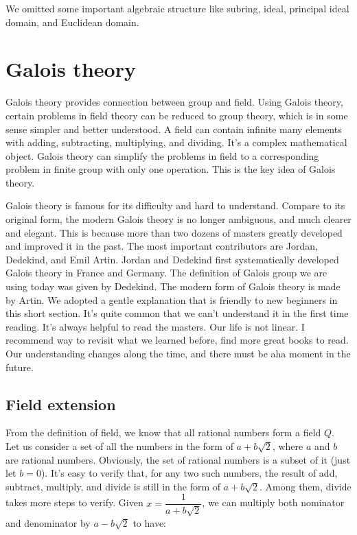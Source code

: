 \documentclass{article}
\begin{document}
We omitted some important algebraic structure like subring, ideal, principal ideal domain, and Euclidean domain.

\section{Galois theory}

Galois theory provides connection between group and field. Using Galois theory, certain problems in field theory can be reduced to group theory, which is in some sense simpler and better understood. A field can contain infinite many elements with adding, subtracting, multiplying, and dividing. It's a complex mathematical object. Galois theory can simplify the problems in field to a corresponding problem in finite group with only one operation. This is the key idea of Galois theory.

Galois theory is famous for its difficulty and hard to understand. Compare to its original form, the modern Galois theory is no longer ambiguous, and much clearer and elegant. This is because more than two dozens of masters greatly developed and improved it in the past. The most important contributors are Jordan, Dedekind, and Emil Artin. Jordan and Dedekind first systematically developed Galois theory in France and Germany. The definition of Galois group we are using today was given by Dedekind. The modern form of Galois theory is made by Artin\cite{ZhangPu2013}. We adopted a gentle explanation that is friendly to new beginners\cite{Stillwell1994} in this short section. It's quite common that we can't understand it in the first time reading. It's always helpful to read the masters. Our life is not linear. I recommend way to revisit what we learned before, find more great books to read. Our understanding changes along the time, and there must be aha moment in the future.

\subsection{Field extension}

From the definition of field, we know that all rational numbers form a field $Q$. Let us consider a set of all the numbers in the form of $a + b\sqrt{2}$, where $a$ and $b$ are rational numbers\cite{Goodman2011}. Obviously, the set of rational numbers is a subset of it (just let $b = 0$). It's easy to verify that, for any two such numbers, the result of add, subtract, multiply, and divide is still in the form of $a + b \sqrt{2}$. Among them, divide takes more steps to verify. Given $x = \dfrac{1}{a + b\sqrt{2}}$, we can multiply both nominator and denominator by $a - b \sqrt{2}$ to have:
\end{document}
